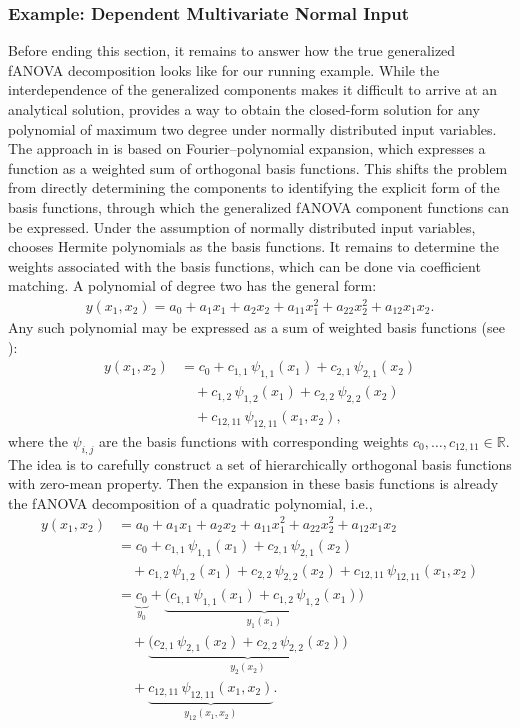 \subsubsection{Example: Dependent Multivariate Normal Input}
Before ending this section, it remains to answer how the true generalized fANOVA decomposition looks like for our running example. While the interdependence of the generalized components makes it difficult to arrive at an analytical solution, \citet{rahman2014} provides a way to obtain the closed-form solution for any polynomial of maximum two degree under normally distributed input variables.
The approach in \cite{rahman2014} is based on Fourier–polynomial expansion, which expresses a function as a weighted sum of orthogonal basis functions.
This shifts the problem from directly determining the components
to identifying the explicit form of the basis functions, through which the generalized fANOVA component functions can be expressed.
Under the assumption of normally distributed input variables, \citet{rahman2014} chooses Hermite polynomials as the basis functions.
It remains to determine the weights associated with the basis functions,
which can be done via coefficient matching.
A polynomial of degree two has the general form:
\begin{align}\label{eq:quadratic_polynomial}
    y(x_1,x_2)
    = a_0 + a_1 x_1 + a_2 x_2 
      + a_{11} x_1^2 + a_{22} x_2^2 + a_{12} x_1 x_2.
\end{align}
Any such polynomial may be expressed as a sum of weighted basis functions 
(see \cite{nagler2024linalg}):
\[
\begin{aligned}
y(x_1,x_2)
    &= c_0 
     + c_{1,1}\,\psi_{1,1}(x_1) 
     + c_{2,1}\,\psi_{2,1}(x_2) \\ 
    &\quad
     + c_{1,2}\,\psi_{1,2}(x_1)
     + c_{2,2}\,\psi_{2,2}(x_2) \\
    &\quad
     + c_{12,11}\,\psi_{12,11}(x_1,x_2),
\end{aligned}
\]
where the $\psi_{i,j}$ are the basis functions with corresponding weights 
$c_0, \dots , c_{12,11} \in \mathbb{R}$.
The idea is to carefully construct a set of hierarchically orthogonal basis functions with zero-mean property. Then the expansion in these basis functions is already the 
fANOVA decomposition of a quadratic polynomial, i.e.,
\begin{align*}
y(x_1,x_2) 
&= a_0 + a_1 x_1 + a_2 x_2 
   + a_{11} x_1^2 + a_{22} x_2^2 + a_{12} x_1 x_2 \\[0.5em]
&= c_0 
   + c_{1,1}\,\psi_{1,1}(x_1) 
   + c_{2,1}\,\psi_{2,1}(x_2) \\[0.5em]
&\quad
   + c_{1,2}\,\psi_{1,2}(x_1)
   + c_{2,2}\,\psi_{2,2}(x_2)
   + c_{12,11}\,\psi_{12,11}(x_1,x_2) \\[0.5em]
&= 
   \underbrace{c_0}_{y_0}
   + \underbrace{\big(c_{1,1}\,\psi_{1,1}(x_1) 
                     + c_{1,2}\,\psi_{1,2}(x_1)\big)}_{y_1(x_1)} \\[0.5em]
&\quad
   + \underbrace{\big(c_{2,1}\,\psi_{2,1}(x_2) 
                     + c_{2,2}\,\psi_{2,2}(x_2)\big)}_{y_2(x_2)} \\[0.5em]
&\quad
   + \underbrace{c_{12,11}\,\psi_{12,11}(x_1,x_2)}_{y_{12}(x_1,x_2)}.
\end{align*}
